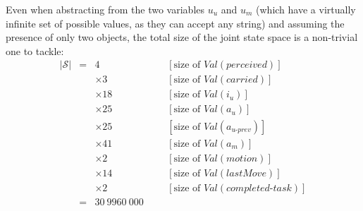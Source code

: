 Even when abstracting from the two variables $u_u$ and $u_m$ (which have a virtually infinite set of possible values, as they can accept any string) and assuming the presence of only two objects, the total size of the joint state space is a non-trivial one to tackle: 
\begin{align}
|\mathcal{S}| & = & 4 &&& [\text{size of } Val(\mathit{perceived})] \nonumber \\
 && \times 3 &&&  [\text{size of } Val(carried)] \nonumber \\
 && \times 18 &&&  [\text{size of } Val(i_u)] \nonumber \\
&&  \times 25 &&&  [\text{size of } Val(a_u)] \nonumber \\
&&  \times 25 &&&  [\text{size of } Val(a_{u\mbox{-}prev})] \nonumber \\
&&  \times 41 &&&  [\text{size of } Val(a_m)] \nonumber \\
&&  \times 2 &&&  [\text{size of } Val(\mathit{motion})] \nonumber \\
&&  \times 14 &&&  [\text{size of } Val(\mathit{lastMove})] \nonumber \\
&&  \times 2 &&&  [\text{size of } Val(\mathit{completed\mbox{-}task})] \nonumber \\
 & =  & 30 \ 9960 \ 000 &&& \nonumber 
  \end{align}
 
